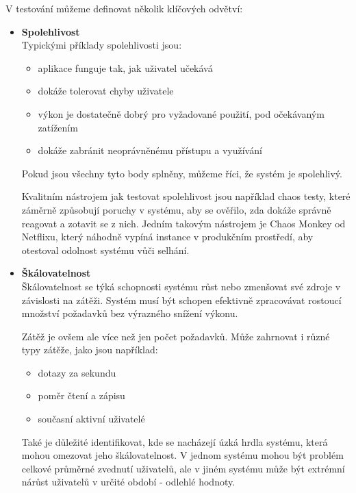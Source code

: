 V testování můžeme definovat několik klíčových odvětví:
\begin{itemize}
    \item \textbf{Spolehlivost} \\
    Typickými příklady spolehlivosti jsou:
        \begin{itemize}
            \item aplikace funguje tak, jak uživatel učekává
            \item dokáže tolerovat chyby uživatele
            \item výkon je dostatečně dobrý pro vyžadované použití, pod očekávaným zatížením
            \item dokáže zabránit neoprávněnému přístupu a využívání
        \end{itemize}
    Pokud jsou všechny tyto body splněny, můžeme říci, že systém je spolehlivý. \cite{kleppmann2017designing}
    
    Kvalitním nástrojem jak testovat spolehlivost jsou například chaos testy, které záměrně způsobují poruchy v systému, aby se ověřilo, zda dokáže správně reagovat a zotavit se z nich.
    Jedním takovým nástrojem je Chaos Monkey od Netflixu, který náhodně vypíná instance v produkčním prostředí, aby otestoval odolnost systému vůči selhání. \cite{chaosmonkeydocs}

    \item \textbf{Škálovatelnost} \\
    Škálovatelnost se týká schopnosti systému růst nebo zmenšovat své zdroje v závislosti na zátěži. Systém musí být schopen efektivně zpracovávat rostoucí množství požadavků bez výrazného snížení výkonu.

    Zátěž je ovšem ale více než jen počet požadavků. Může zahrnovat i různé typy zátěže, jako jsou například:
    \begin{itemize}
        \item dotazy za sekundu
        \item poměr čtení a zápisu
        \item současní aktivní uživatelé
    \end{itemize}

    Také je důležité identifikovat, kde se nacházejí úzká hrdla systému, která mohou omezovat jeho škálovatelnost.
    V jednom systému mohou být problém celkové průměrné zvednutí uživatelů, ale v jiném systému může být extrémní nárůst uživatelů v určité období - odlehlé hodnoty. \cite{kleppmann2017designing}
    

\end{itemize}
